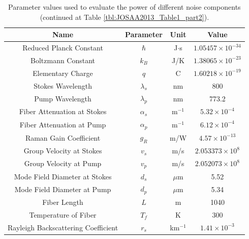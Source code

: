 \begin{table}[t]
\begin{centering}
\begin{tabular}{|c|c|c|c|} \hline
Name & Parameter & Unit & Value\\ \hline\hline
Reduced Planck Constant & $\hbar$ & J$\cdot$s & $1.05457 \times 10^{-34}$ \\ \hline
Boltzmann Constant & $k_B$ & J/K & $1.38065 \times 10^{-23}$  \\ \hline
Elementary Charge & $q$ & C & $1.60218 \times 10^{-19}$  \\ \hline 
Stokes Wavelength & $\lambda_s$ & nm & 800 \\ \hline
Pump Wavelength & $\lambda_p$ & nm & 773.2 \\ \hline
Fiber Attenuation at Stokes & $\alpha_s$ & m$^{-1}$ & $5.32 \times 10^{-4}$ \\ \hline
Fiber Attenuation at Pump & $\alpha_p$ & m$^{-1}$ & $6.12 \times 10^{-4}$ \\ \hline
Raman Gain Coefficient & $g_R$ & m/W & $4.57 \times 10^{-13}$ \\ \hline
Group Velocity at Stokes & $v_s$ & m/s & $2.053373 \times 10^8$ \\ \hline
Group Velocity at Pump & $v_p$ & m/s & $2.052073 \times 10^8$ \\ \hline
Mode Field Diameter at Stokes & $d_s$ & $\mu$m & 5.52 \\ \hline
Mode Field Diameter at Pump & $d_p$ & $\mu$m & 5.34 \\ \hline
Fiber Length & $L$ & m & 1040 \\ \hline
Temperature of Fiber& $T_f$ & K & 300 \\ \hline
Rayleigh Backscattering Coefficient & $r_s$ & km$^{-1}$ & $1.41 \times 10^{-3}$ \\ \hline
\end{tabular}
\caption{Parameter values used to evaluate the power of different noise components (continued at Table \ref{tbl:JOSAA2013_Table1_part2}).}
\label{tbl:JOSAA2013_Table1_part1}
\end{centering}
\end{table}

